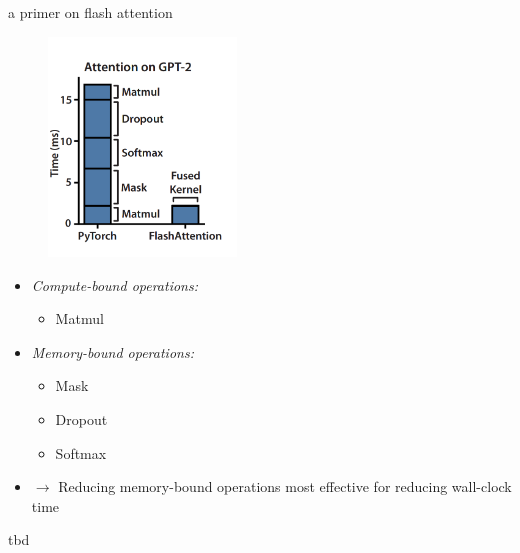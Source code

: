 \begin{frame}{a primer on flash attention}

\begin{minipage}[c]{.49\textwidth}
\vfill
	\begin{figure}
		\centering
		\includegraphics[width = 5cm]{figure/flash-attn.png}\\ 
	\end{figure}
	\vfill
\end{minipage}
\hfill
\begin{minipage}[c]{.49\textwidth}
	\begin{itemize}
	\item \textit{Compute-bound operations:} 
			\begin{itemize}
				\item Matmul
			\end{itemize}
	\item \textit{Memory-bound operations:}
			\begin{itemize}
				\item Mask
				\item Dropout
				\item Softmax
			\end{itemize}
	\item[] $\to$ Reducing memory-bound operations most effective for reducing wall-clock time
	\end{itemize}
\end{minipage}

\end{frame}


\begin{frame}{tbd}

\vfill

\vfill

\end{frame}


\endlecture

